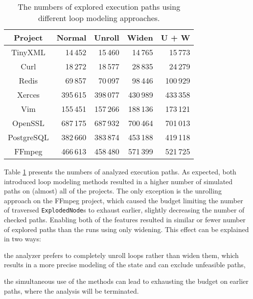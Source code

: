\documentclass[oneside, a4paper, 12pt]{article}
\theoremstyle{definition}
\begin{document}
\begin{table}[!htb]
	\centering
\begin{tabular}{ |c||r|r|r|r| } 
	\hline
	Project & Normal & Unroll & Widen & U + W \\
	\hline \hline
	TinyXML & 14\,452 & 15\,460 & 14\,765 & 15\,773 \\ 
	\hline
	Curl & 18\,272 & 18\,577 & 28\,835 & 24\,279 \\
	\hline
	Redis & 69\,857 & 70\,097 & 98\,446 & 100\,929 \\ 
	\hline
	Xerces & 395\,615 & 398\,077 & 430\,989 & 433\,358 \\ 
	\hline
	Vim & 155\,451 & 157\,266 & 188\,136 & 173\,121 \\ 
	\hline
	OpenSSL & 687\,175 & 687\,932 & 700\,464 & 701\,013 \\ 
	\hline
	PostgreSQL & 382\,660 & 383\,874 & 453\,188 & 419\,118  \\ 
	\hline
	FFmpeg & 466\,613 & 458\,480 & 571\,399 & 521\,725  \\ 		
	\hline
\end{tabular}
\caption{The numbers of explored execution paths using different loop modeling
approaches.}\label{tab:pathnum}
\end{table}
Table \ref{tab:pathnum} presents the numbers of analyzed execution paths.
As expected, both introduced loop modeling methods resulted in a higher number of
simulated paths on (almost) all of the projects. The only exception is the unrolling 
approach on the FFmpeg project, which caused the budget limiting the number of 
traversed \texttt{ExplodedNode}s to exhaust earlier, slightly decreasing 
the number of checked paths. Enabling both of the features resulted in similar or 
fewer number of explored paths than the runs using only widening. 
This effect can be explained in two ways:   
\begin{enumerate*} [label={(\arabic*)}, noitemsep]
	\item the analyzer prefers to completely unroll loops rather than widen them, 
    which results in a more precise modeling of the state and can exclude unfeasible 
    paths,
	\item the simultaneous use of the methods can lead to exhausting the budget on earlier paths, where the analysis will be terminated.
\end{enumerate*}
\end{document}

